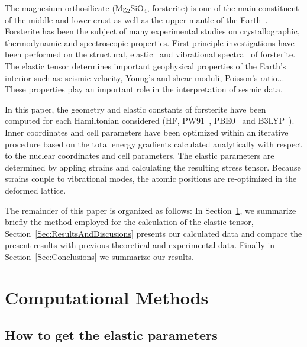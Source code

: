 \documentclass[pra,twocolumn,twocolumngrid,superbib]{revtex4} %
\begin{document}
The magnesium orthosilicate (Mg$_2$SiO$_4$, forsterite) is one of the main
constituent of the middle and lower crust as well as the upper mantle of 
the Earth~\cite{DLAnderson98}. Forsterite has been the subject of 
many experimental studies on crystallographic, thermodynamic and 
spectroscopic properties. First-principle investigations have been performed
on the structural, elastic~\cite{PJochym04,JBrodholt96,CSilva97} 
and vibrational spectra~\cite{YNoel06} of forsterite.
%
%
The elastic tensor determines important geophysical properties
of the Earth's interior such as: seismic velocity, Young's and shear moduli, 
Poisson's ratio... These properties play an important role in the interpretation
of sesmic data.

In this paper, the geometry and elastic constants of forsterite 
have been computed for each Hamiltonian
considered (HF, PW91~\cite{JPerdew92}, PBE0~\cite{Perdew_96v77,CAdamo99} 
and B3LYP~\cite{ABecke93,Stephens94}). 
Inner coordinates and cell parameters have been optimized
within an iterative procedure based on the total
energy gradients calculated analytically with respect to the nuclear
coordinates and cell parameters. 
The elastic parameters are determined by appling strains and calculating the
resulting stress tensor. Because strains couple to vibrational modes, the atomic
positions are re-optimized in the deformed lattice.


The remainder of this paper is organized as follows:
In Section~\ref{Sec:ComputMethods}, we summarize briefly the method employed for the
calculation of the elastic tensor, Section~\ref{Sec:ResultsAndDiscusions}
presents our calculated data and compare the present results with previous theoretical and
experimental data. Finally in Section~\ref{Sec:Conclusions} we summarize our results.

\section{Computational Methods}\label{Sec:ComputMethods}

\subsection{How to get the elastic parameters}
\end{document}
